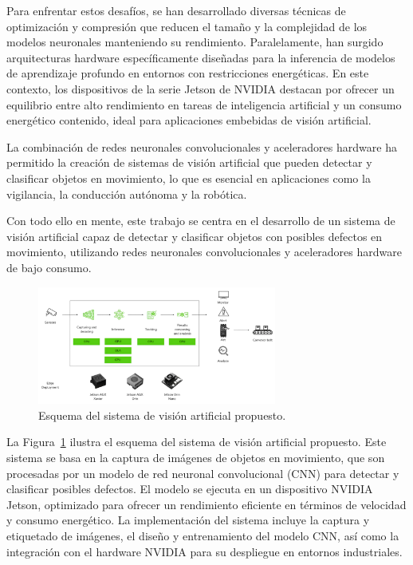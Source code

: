 \documentclass[11pt,spanish,listoffigures,listoftables]{tfgetsinf}
\begin{document}
Para enfrentar estos desafíos, se han desarrollado diversas técnicas de optimización y compresión que reducen el tamaño y la complejidad de los modelos neuronales manteniendo su rendimiento. Paralelamente, han surgido arquitecturas hardware específicamente diseñadas para la inferencia de modelos de aprendizaje profundo en entornos con restricciones energéticas. En este contexto, los dispositivos de la serie Jetson de NVIDIA\cite{nvidia_jetson_modules} destacan por ofrecer un equilibrio entre alto rendimiento en tareas de inteligencia artificial y un consumo energético contenido, ideal para aplicaciones embebidas de visión artificial.

La combinación de redes neuronales convolucionales y aceleradores hardware ha permitido la creación de sistemas de visión artificial que pueden detectar y clasificar objetos en movimiento, lo que es esencial en aplicaciones como la vigilancia, la conducción autónoma y la robótica.

Con todo ello en mente, este trabajo se centra en el desarrollo de un sistema de visión artificial capaz de detectar y clasificar objetos con posibles defectos en movimiento, utilizando redes neuronales convolucionales y aceleradores hardware de bajo consumo. 

\begin{figure}[H]
   \centering
   \includegraphics[width=0.7\textwidth]{images/diseno_e_implementacion/figura_TFG_v3.png}
   \caption{Esquema del sistema de visión artificial propuesto.}
\label{fig:esquema_TFG}
\end{figure}

La Figura~\ref{fig:esquema_TFG} ilustra el esquema del sistema de visión artificial propuesto. Este sistema se basa en la captura de imágenes de objetos en movimiento, que son procesadas por un modelo de red neuronal convolucional (CNN) para detectar y clasificar posibles defectos. El modelo se ejecuta en un dispositivo NVIDIA Jetson, optimizado para ofrecer un rendimiento eficiente en términos de velocidad y consumo energético. La implementación del sistema incluye la captura y etiquetado de imágenes, el diseño y entrenamiento del modelo CNN, así como la integración con el hardware NVIDIA para su despliegue en entornos industriales.
\end{document}
